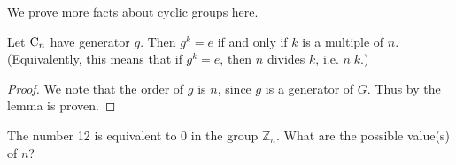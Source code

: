 We prove more facts about cyclic groups here.
\begin{lemma}\label{lemma-order-of-an-element-that-is-equivalent-to-identity}
    Let $\mathrm{C}_{n}$ have generator $g$. Then $g^k = e$ if and only if $k$ is a multiple of $n$.\newline
    (Equivalently, this means that if $g^k = e$, then $n$ divides $k$, i.e. $n\vert k$.)
\end{lemma}
\begin{proof}
    We note that the order of $g$ is $n$, since $g$ is a generator of $G$. Thus by  the lemma is proven.
\end{proof}

\begin{exercise}
    The number 12 is equivalent to 0 in the group $\mathbb{Z}_n$. What are the possible value(s) of $n$?
\end{exercise}

